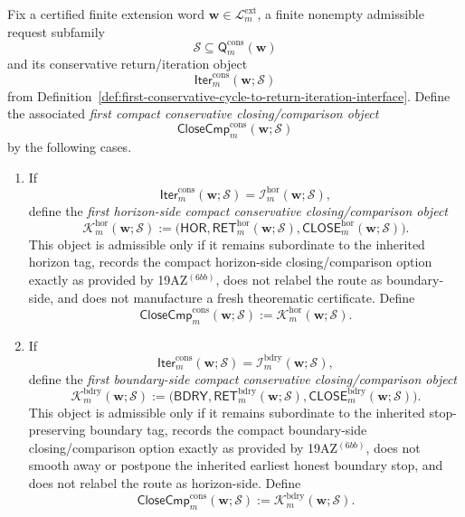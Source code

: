 \begin{definition}
\label{def:first-compact-conservative-closing-comparison-form}
Fix a certified finite extension word \(\mathbf w\in\mathcal L^{\mathrm{ext}}_{m}\), a finite nonempty admissible request subfamily
\[
 \mathcal S \subseteq \mathsf{Q}^{\mathrm{cons}}_{m}(\mathbf w)
\]
and its conservative return/iteration object
\[
 \mathsf{Iter}^{\mathrm{cons}}_{m}(\mathbf w;\mathcal S)
\]
from Definition~\ref{def:first-conservative-cycle-to-return-iteration-interface}. Define the associated \emph{first compact conservative closing/comparison object}
\[
 \mathsf{CloseCmp}^{\mathrm{cons}}_{m}(\mathbf w;\mathcal S)
\]
by the following cases.
\begin{enumerate}[label=(\roman*)]
 \item If
 \[
 \mathsf{Iter}^{\mathrm{cons}}_{m}(\mathbf w;\mathcal S)
 =
 \mathcal I^{\mathrm{hor}}_{m}(\mathbf w;\mathcal S),
 \]
define the \emph{first horizon-side compact conservative closing/comparison object}
\[
 \mathcal K^{\mathrm{hor}}_{m}(\mathbf w;\mathcal S)
 :=
 \bigl(
 \mathsf{HOR},
 \mathsf{RET}^{\mathrm{hor}}_{m}(\mathbf w;\mathcal S),
 \mathsf{CLOSE}^{\mathrm{hor}}_{m}(\mathbf w;\mathcal S)
 \bigr).
\]
This object is admissible only if it remains subordinate to the inherited horizon tag, records the compact horizon-side closing/comparison option exactly as provided by 19AZ$^{(6bb)}$, does not relabel the route as boundary-side, and does not manufacture a fresh theorematic certificate. Define
\[
 \mathsf{CloseCmp}^{\mathrm{cons}}_{m}(\mathbf w;\mathcal S)
 :=
 \mathcal K^{\mathrm{hor}}_{m}(\mathbf w;\mathcal S).
\]

 \item If
 \[
 \mathsf{Iter}^{\mathrm{cons}}_{m}(\mathbf w;\mathcal S)
 =
 \mathcal I^{\mathrm{bdry}}_{m}(\mathbf w;\mathcal S),
 \]
define the \emph{first boundary-side compact conservative closing/comparison object}
\[
 \mathcal K^{\mathrm{bdry}}_{m}(\mathbf w;\mathcal S)
 :=
 \bigl(
 \mathsf{BDRY},
 \mathsf{RET}^{\mathrm{bdry}}_{m}(\mathbf w;\mathcal S),
 \mathsf{CLOSE}^{\mathrm{bdry}}_{m}(\mathbf w;\mathcal S)
 \bigr).
\]
This object is admissible only if it remains subordinate to the inherited stop-preserving boundary tag, records the compact boundary-side closing/comparison option exactly as provided by 19AZ$^{(6bb)}$, does not smooth away or postpone the inherited earliest honest boundary stop, and does not relabel the route as horizon-side. Define
\[
 \mathsf{CloseCmp}^{\mathrm{cons}}_{m}(\mathbf w;\mathcal S)
 :=
 \mathcal K^{\mathrm{bdry}}_{m}(\mathbf w;\mathcal S).
\]
\end{enumerate}
\end{definition}

